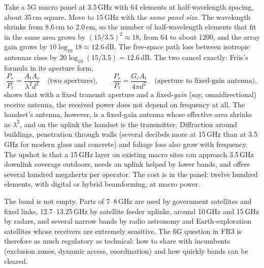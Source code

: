 
\begin{worked}
Take a 5G macro panel at 3.5\,GHz with 64 elements at half-wavelength spacing, about 35\,cm
square. Move to 15\,GHz with the \emph{same panel size}. The wavelength shrinks from 8.6\,cm to 2.0\,cm, so the number
of half-wavelength elements that fit in the same area grows by $(15/3.5)^2\approx18$, from 64 to about
1200, and the array gain grows by $10\log_{10}18\approx12.6$\,dB. The free-space path loss between
isotropic antennas rises by $20\log_{10}(15/3.5)=12.6$\,dB. The two cancel exactly: Friis's formula
in its aperture form,
\begin{equation}
\frac{P_r}{P_t}=\frac{A_tA_r}{\lambda^2d^2}\quad\text{(two apertures)},\qquad
\frac{P_r}{P_t}=\frac{G_rA_t}{4\pi d^2}\quad\text{(aperture to fixed-gain antenna)},
\label{eq:ch25:friisap}
\end{equation}
shows that with a fixed transmit aperture and a fixed-\emph{gain} (say, omnidirectional) receive
antenna, the received power does not depend on frequency at all. The handset's antenna, however, is a
fixed-gain antenna whose effective area shrinks as $\lambda^2$, and on the uplink the handset is the
transmitter. Diffraction around buildings, penetration through walls (several decibels more at
15\,GHz than at 3.5\,GHz for modern glass and concrete) and foliage loss also grow with frequency.
The upshot is that a 15\,GHz layer on existing macro sites can approach 3.5\,GHz downlink coverage
outdoors, needs an uplink helped by lower bands, and offers several hundred megahertz per operator.
The cost is in the panel: twelve hundred elements, with digital or hybrid beamforming, at macro power.
\end{worked}

The band is not empty. Parts of 7--8\,GHz are used by government satellites and fixed links,
12.7--13.25\,GHz by satellite feeder uplinks, around 10\,GHz and 15\,GHz by radars, and several
narrow bands by radio astronomy and Earth-exploration satellites whose receivers are extremely
sensitive. The 6G question in FR3 is therefore as much regulatory as technical: how to share with
incumbents (exclusion zones, dynamic access, coordination) and how quickly bands can be cleared.

